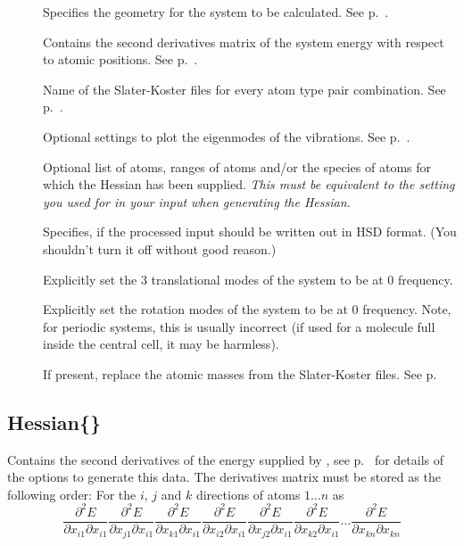 \begin{description}
\item[] Specifies the geometry for the system to be
  calculated.  See p.~.
\item[] Contains the second derivatives matrix of the
  system energy with respect to atomic positions. See
  p.~.
\item[] Name of the Slater-Koster files for every atom
  type pair combination. See p.~.
\item[] Optional settings to plot the eigenmodes of the
  vibrations. See p.~.
\item[] Optional list of atoms, ranges of atoms and/or the species of
  atoms for which the Hessian has been supplied. \emph{This must be equivalent
    to the setting you used for  in your \dftbp{} input when
    generating the Hessian.}
\item[] Specifies, if the processed input should be written
  out in HSD format. (You shouldn't turn it off without good reason.)
\item[] Explicitly set the 3 translational modes of the
  system to be at 0 frequency.
\item[] Explicitly set the rotation modes of the system to be
  at 0 frequency. Note, for periodic systems, this is usually incorrect (if used
  for a molecule full inside the central cell, it may be harmless).
\item[] If present, replace the atomic masses from the Slater-Koster files. See
  p.~
\end{description}


\subsection{Hessian\{\}}
\label{sec:modes.Hessian}

Contains the second derivatives of the energy supplied by
{\dftbp}, see p.~ for details of the options
to generate this data. The derivatives matrix must be stored as the following
order: For the $i$, $j$ and $k$ directions of atoms $1 \ldots n$
as
\begin{equation*}
  \frac{\partial^2 E}{\partial x_{i1} \partial x_{i1}} \frac{\partial^2
    E}{\partial x_{j1} \partial x_{i1}} \frac{\partial^2 E}{\partial x_{k1}
    \partial x_{i1}} \frac{\partial^2 E}{\partial x_{i2} \partial x_{i1}}
  \frac{\partial^2 E}{\partial x_{j2} \partial x_{i1}} \frac{\partial^2
    E}{\partial x_{k2} \partial x_{i1}} \ldots \frac{\partial^2 E}{\partial
    x_{kn} \partial x_{kn}}
\end{equation*}

